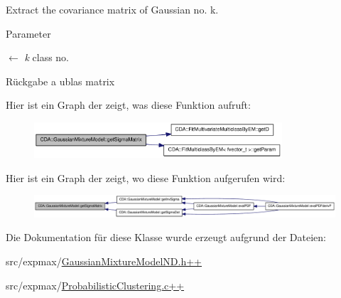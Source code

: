 Extract the covariance matrix of Gaussian no. k. 


\begin{DoxyParams}{Parameter}
\item[\mbox{$\leftarrow$} {\em k}]class no.\end{DoxyParams}
\begin{DoxyReturn}{Rückgabe}
a ublas matrix 
\end{DoxyReturn}


Hier ist ein Graph der zeigt, was diese Funktion aufruft:\nopagebreak
\begin{figure}[H]
\begin{center}
\leavevmode
\includegraphics[width=262pt]{classCDA_1_1GaussianMixtureModel_a0950a8909e82521c0919f337d18dbe04_cgraph}
\end{center}
\end{figure}




Hier ist ein Graph der zeigt, wo diese Funktion aufgerufen wird:\nopagebreak
\begin{figure}[H]
\begin{center}
\leavevmode
\includegraphics[width=420pt]{classCDA_1_1GaussianMixtureModel_a0950a8909e82521c0919f337d18dbe04_icgraph}
\end{center}
\end{figure}




Die Dokumentation für diese Klasse wurde erzeugt aufgrund der Dateien:\begin{DoxyCompactItemize}
\item 
src/expmax/\hyperlink{GaussianMixtureModelND_8h_09_09}{GaussianMixtureModelND.h++}\item 
src/expmax/\hyperlink{ProbabilisticClustering_8c_09_09}{ProbabilisticClustering.c++}\end{DoxyCompactItemize}
